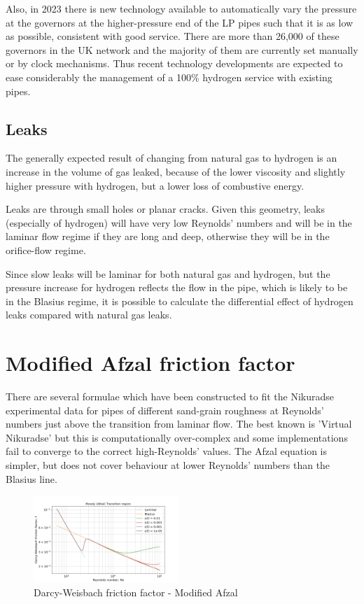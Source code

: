 \documentclass[5p]{elsarticle} %
\begin{document}
Also, in 2023 there is new technology available to automatically vary the pressure at the governors at the higher-pressure end of the LP pipes such that it is as low as possible, consistent with good service\citep{utonomy23}. 
There are more than 26,000 of these governors in the UK network and the majority of them are currently set manually or by clock mechanisms. 
Thus recent technology developments are expected to ease considerably  the management of a 100\% hydrogen service with existing pipes.

\subsection{Leaks}
\label{leaks}
The generally expected result of changing from natural gas to hydrogen is an increase in the volume of gas leaked, because of the lower viscosity and slightly higher pressure with hydrogen, but a lower loss of combustive energy. 

Leaks are through small holes or planar cracks. Given this geometry, leaks (especially of hydrogen) will have very low Reynolds' numbers and will be in the laminar flow regime if they are long and deep, otherwise they will be in the orifice-flow regime\citep{Plascencia2020}.

Since slow leaks will be laminar for both natural gas and hydrogen, but the pressure increase for hydrogen reflects the flow in the pipe, which is likely to be in the Blasius regime, it is possible to calculate the differential effect of hydrogen leaks compared with natural gas leaks.

\section{Modified Afzal friction factor }
\label{afzal2}
There are several formulae which have been constructed to fit the Nikuradse experimental data for pipes of different sand-grain roughness at Reynolds' numbers just above the transition from laminar flow. The best known is 'Virtual Nikuradse' \citep{Yang2009} but this is computationally over-complex and some implementations fail to converge to the correct high-Reynolds' values. The Afzal equation \citep{Afzal2007} is simpler, but does not cover behaviour at lower Reynolds' numbers than the  Blasius line.

\begin{figure}[htb]
\centering
\includegraphics[width=0.49\textwidth]{moody_afzal_enlarge.png}
\caption{Darcy-Weisbach friction factor - Modified Afzal }
\label{fig:afzal-mod}
\end{figure}
\end{document}
